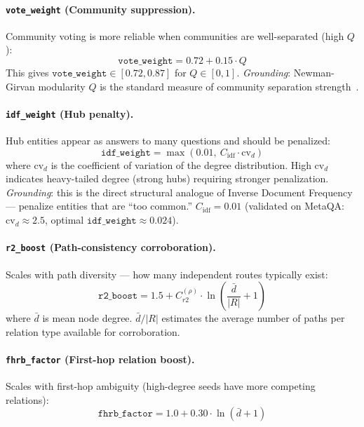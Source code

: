 \documentclass[10pt,twocolumn]{article}
\begin{document}
\paragraph{\texttt{vote\_weight} (Community suppression).}
Community voting is more reliable when communities are well-separated (high $Q$):
\begin{equation}
  \texttt{vote\_weight} = 0.72 + 0.15 \cdot Q
  \label{eq:vote}
\end{equation}
This gives $\texttt{vote\_weight} \in [0.72, 0.87]$ for $Q \in [0, 1]$.
\emph{Grounding}: Newman-Girvan modularity $Q$ is the standard measure of
community separation strength~\cite{newman2004modularity}.

\paragraph{\texttt{idf\_weight} (Hub penalty).}
Hub entities appear as answers to many questions and should be penalized:
\begin{equation}
  \texttt{idf\_weight} = \max(0.01,\ C_{\mathrm{idf}} \cdot \mathrm{cv}_d)
  \label{eq:idf}
\end{equation}
where $\mathrm{cv}_d$ is the coefficient of variation of the degree distribution.
High $\mathrm{cv}_d$ indicates heavy-tailed degree (strong hubs) requiring stronger
penalization. \emph{Grounding}: this is the direct structural analogue of
Inverse Document Frequency~\cite{sparckjones1972} --- penalize entities that are
``too common.'' $C_{\mathrm{idf}} = 0.01$ (validated on MetaQA: $\mathrm{cv}_d \approx 2.5$,
optimal $\texttt{idf\_weight} \approx 0.024$).

\paragraph{\texttt{r2\_boost} (Path-consistency corroboration).}
Scales with path diversity --- how many independent routes typically exist:
\begin{equation}
  \texttt{r2\_boost} = 1.5 + C_{r2}^{(\rho)} \cdot \ln\!\left(\frac{\bar{d}}{|R|} + 1\right)
  \label{eq:r2}
\end{equation}
where $\bar{d}$ is mean node degree. $\bar{d}/|R|$ estimates the average number
of paths per relation type available for corroboration.

\paragraph{\texttt{fhrb\_factor} (First-hop relation boost).}
Scales with first-hop ambiguity (high-degree seeds have more competing relations):
\begin{equation}
  \texttt{fhrb\_factor} = 1.0 + 0.30 \cdot \ln(\bar{d} + 1)
  \label{eq:fhrb}
\end{equation}
\end{document}
